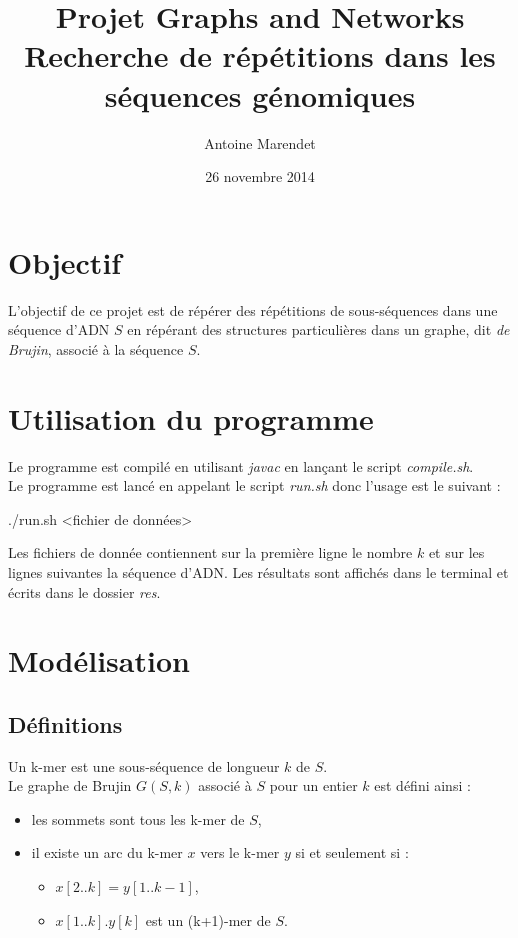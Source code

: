 \documentclass{article}
\title{Projet Graphs and Networks\\Recherche de répétitions dans les séquences génomiques}
\author{Antoine Marendet}
\date{26 novembre 2014}
\begin{document}
\maketitle

\section{Objectif}

L'objectif de ce projet est de répérer des répétitions de sous-séquences dans une séquence d'ADN $S$ en répérant des structures particulières dans un graphe, dit \textit{de Brujin}, associé à la séquence $S$.

\section{Utilisation du programme}

Le programme est compilé en utilisant \textit{javac} en lançant le script \textit{compile.sh}.\\
Le programme est lancé en appelant le script \textit{run.sh} donc l'usage est le suivant :
\begin{center}
	./run.sh <fichier de données>
\end{center}
Les fichiers de donnée contiennent sur la première ligne le nombre $k$ et sur les lignes suivantes la séquence d'ADN.
Les résultats sont affichés dans le terminal et écrits dans le dossier \textit{res}.

\section{Modélisation}

\subsection{Définitions}
Un k-mer est une sous-séquence de longueur $k$ de $S$.\\
Le graphe de Brujin $G(S,k)$ associé à $S$ pour un entier $k$ est défini ainsi : 
\begin{itemize}
\item les sommets sont tous les k-mer de $S$,
\item il existe un arc du k-mer $x$ vers le k-mer $y$ si et seulement si :
\begin{itemize}
\item $x[2..k] = y[1..k-1]$,
\item $x[1..k].y[k]$ est un (k+1)-mer de $S$.
\end{itemize}
\end{itemize} 
\end{document}
